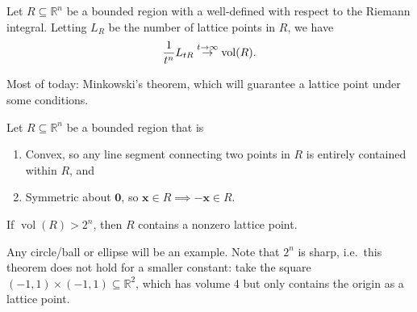\begin{theorem}

Let \(R \subseteq {\mathbb{R}}^n\) be a bounded region with a
well-defined with respect to the Riemann integral. Letting \(L_{R}\) be
the number of lattice points in \(R\), we have
\begin{align*}
{1\over t^n} L_{tR} \overset{t\to \infty}\to \operatorname{vol}(R)
.\end{align*}

\end{theorem}

\begin{remark}

Most of today: Minkowski's theorem, which will guarantee a lattice point
under some conditions.

\end{remark}

\begin{theorem}

Let \(R \subseteq {\mathbb{R}}^n\) be a bounded region that is

\begin{enumerate}
\def\labelenumi{\arabic{enumi}.}
\item
  Convex, so any line segment connecting two points in \(R\) is entirely
  contained within \(R\), and
\item
  Symmetric about \(\mathbf{0}\), so
  \(\mathbf{x}\in R\implies -\mathbf{x}\in R\).
\end{enumerate}

If \(\operatorname{vol}(R) > 2^n\), then \(R\) contains a nonzero
lattice point.

\end{theorem}

\begin{remark}

Any circle/ball or ellipse will be an example. Note that \(2^n\) is
sharp, i.e.~this theorem does not hold for a smaller constant: take the
square \((-1, 1) \times(-1, 1) \subseteq {\mathbb{R}}^2\), which has
volume 4 but only contains the origin as a lattice point.

\end{remark}

